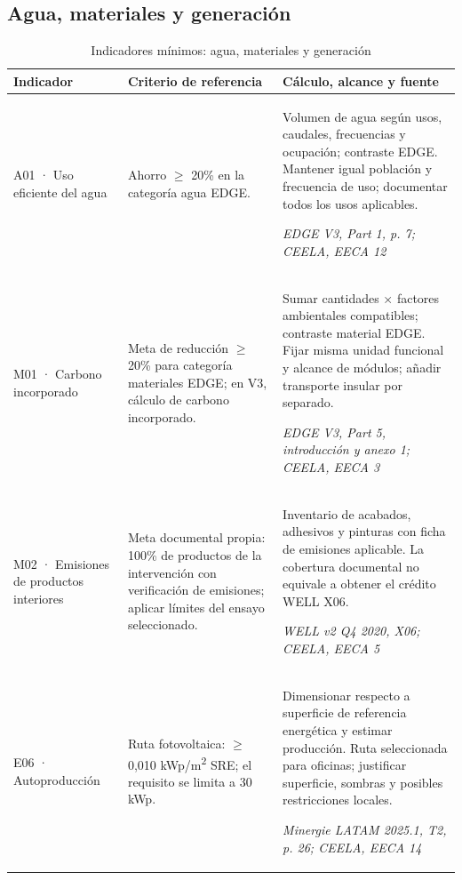 \subsection{Agua, materiales y generación}
\begin{table}[H]\centering\caption{Indicadores mínimos: agua, materiales y generación}
{\fontsize{9.5}{12}\selectfont\singlespacing\renewcommand{\arraystretch}{1.25}\setlength{\tabcolsep}{4pt}\begin{tabular}{>{\raggedright\arraybackslash}p{2.9cm}>{\raggedright\arraybackslash}p{5.2cm}>{\raggedright\arraybackslash}p{5.9cm}}\toprule Indicador & Criterio de referencia & Cálculo, alcance y fuente \\ \midrule
A01 · Uso eficiente del agua & Ahorro $\geq$ 20\% en la categoría agua EDGE. & Volumen de agua según usos, caudales, frecuencias y ocupación; contraste EDGE. Mantener igual población y frecuencia de uso; documentar todos los usos aplicables.\par\textit{EDGE V3, Part 1, p. 7; CEELA, EECA 12} \\[4pt]
M01 · Carbono incorporado & Meta de reducción $\geq$ 20\% para categoría materiales EDGE; en V3, cálculo de carbono incorporado. & Sumar cantidades × factores ambientales compatibles; contraste material EDGE. Fijar misma unidad funcional y alcance de módulos; añadir transporte insular por separado.\par\textit{EDGE V3, Part 5, introducción y anexo 1; CEELA, EECA 3} \\[4pt]
M02 · Emisiones de productos interiores & Meta documental propia: 100\% de productos de la intervención con verificación de emisiones; aplicar límites del ensayo seleccionado. & Inventario de acabados, adhesivos y pinturas con ficha de emisiones aplicable. La cobertura documental no equivale a obtener el crédito WELL X06.\par\textit{WELL v2 Q4 2020, X06; CEELA, EECA 5} \\[4pt]
E06 · Autoproducción & Ruta fotovoltaica: $\geq$ 0,010 kWp/m\textsuperscript{2} SRE; el requisito se limita a 30 kWp. & Dimensionar respecto a superficie de referencia energética y estimar producción. Ruta seleccionada para oficinas; justificar superficie, sombras y posibles restricciones locales.\par\textit{Minergie LATAM 2025.1, T2, p. 26; CEELA, EECA 14} \\[4pt]
\bottomrule\end{tabular}}\end{table}\par\medskip
